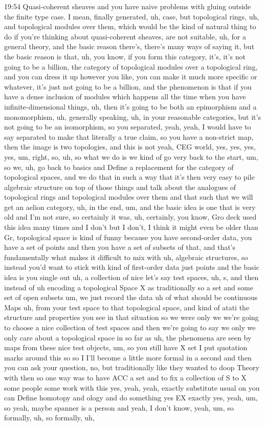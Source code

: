\begin{unfinished}{19:54}
Quasi-coherent sheaves and you have naive problems with gluing outside the finite type case. I mean, finally generated, uh, case, but topological rings, uh, and topological modules over them, which would be the kind of natural thing to do if you're thinking about quasi-coherent sheaves, are not suitable, uh, for a general theory, and the basic reason there's, there's many ways of saying it, but the basic reason is that, uh, you know, if you form this category, it's, it's not going to be a billion, the category of topological modules over a topological ring, and you can dress it up however you like, you can make it much more specific or whatever, it's just not going to be a billion, and the phenomenon is that if you have a dense inclusion of modules which happens all the time when you have infinite-dimensional things, uh, then it's going to be both an epimorphism and a monomorphism, uh, generally speaking, uh, in your reasonable categories, but it's not going to be an isomorphism, so you separated, yeah, yeah, I would have to say separated to make that literally a true claim, so you have a non-strict map, then the image is two topologies, and this is not yeah, CEG world, yes, yes, yes, yes, um, right, so, uh, so what we do is we kind of go very back to the start, um, so we, uh, go back to basics and Define a replacement for the category of topological spaces, and we do that in such a way that it's then very easy to pile algebraic structure on top of those things and talk about the analogues of topological rings and topological modules over them and that such that we will get an aelion category, uh, in the end, um, and the basic idea is one that is very old and I'm not sure, so certainly it was, uh, certainly, you know, Gro deck used this idea many times and I don't but I don't, I think it might even be older than Gr, topological space is kind of funny because you have second-order data, you have a set of points and then you have a set of subsets of that, and that's fundamentally what makes it difficult to mix with uh, algebraic structures, so instead you'd want to stick with kind of first-order data just points and the basic idea is you single out uh, a collection of nice let's say test spaces, uh, s, and then instead of uh encoding a topological Space X as traditionally so a set and some set of open subsets um, we just record the data uh of what should be continuous Maps uh, from your test space to that topological space, and kind of atati the structure and properties you see in that situation so we were only we we're going to choose a nice collection of test spaces and then we're going to say we only we only care about a topological space in so far as uh, the phenomena are seen by maps from these nice test objects, um, so you still have X set I put quotation marks around this so so I I'll become a little more formal in a second and then you can ask your question, no, but traditionally like they wanted to doop Theory with then so one way was to have ACC a set and to fix a collection of S to X some people some work with this yes, yeah, yeah, exactly substitute usual on you can Define homotopy and ology and do something yes EX exactly yes, yeah, um, so yeah, maybe spanner is a person and yeah, I don't know, yeah, um, so formally, uh, so formally, uh, 
\end{unfinished}
